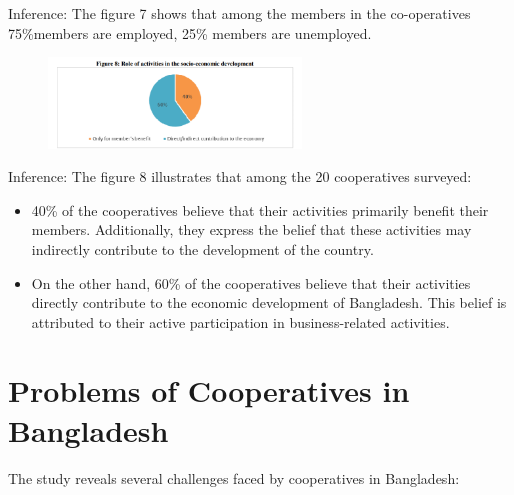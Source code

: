   Inference: The figure 7 shows that among the members in the co-operatives 75\%members are employed, 25\% members are unemployed. 

  \begin{figure}[h]
    \centering
    \includegraphics[width=0.6\textwidth]{Chap1/figure8.PNG}
    \label{fig:example}
  \end{figure}

  Inference: The figure 8 illustrates that among the 20 cooperatives surveyed:

  \begin{itemize}
      \item 40\% of the cooperatives believe that their activities primarily benefit their members. Additionally, they express the belief that these activities may indirectly contribute to the development of the country.
      
      \item On the other hand, 60\% of the cooperatives believe that their activities directly contribute to the economic development of Bangladesh. This belief is attributed to their active participation in business-related activities.
  \end{itemize}
  

  \section{Problems of Cooperatives in Bangladesh}

The study reveals several challenges faced by cooperatives in Bangladesh:

